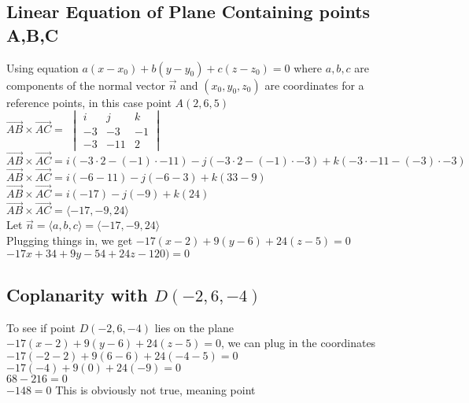 \documentclass{article}
\begin{document}
\subsection{Linear Equation of Plane Containing points A,B,C}
Using equation $a(x-x_0)+b(y-y_0)+c(z-z_0)=0$ where $a, b, c$ are components of the normal vector $\vec{n}$ and $(x_0,y_0,z_0)$ are coordinates for a reference points, in this case point $A(2, 6, 5)$
\\[0.1in]$\vec{AB} \times \vec{AC} = $
$\begin{vmatrix}
i & j & k \\
-3 & -3 & -1 \\
-3 & -11 & 2
\end{vmatrix}$
\\[0.1in]$\vec{AB} \times \vec{AC} = i(-3\cdot2-(-1)\cdot -11)-j(-3\cdot 2-(-1)\cdot -3)+k(-3\cdot-11-(-3)\cdot -3)$
\\[0.1in]$\vec{AB} \times \vec{AC} = i(-6-11)-j(-6-3)+k(33-9)$
\\[0.1in]$\vec{AB} \times \vec{AC} = i(-17)-j(-9)+k(24)$
\\[0.1in]$\vec{AB} \times \vec{AC} = \langle-17,-9,24\rangle$
\\[0.1in] Let $\vec{n} = \langle a,b,c\rangle=\langle-17,-9,24\rangle$
\\[0.1in]Plugging things in, we get ${-17(x-2)+9(y-6)+24(z-5)=0}$
\\[0.1in]${-17x+34+9y-54+24z-120)=0}$
\\[0.1in]
\subsection{Coplanarity with $D(-2, 6,-4)$}
To see if point $D(-2, 6,-4)$ lies on the plane $-17(x-2)+9(y-6)+24(z-5)=0$, we can plug in the coordinates
\\[0.1in]$-17(-2-2)+9(6-6)+24(-4-5)=0$
\\[0.1in]$-17(-4)+9(0)+24(-9)=0$
\\[0.1in]$68-216=0$
\\[0.1in]$-148=0$ This is obviously not true, meaning point 
\end{document}
